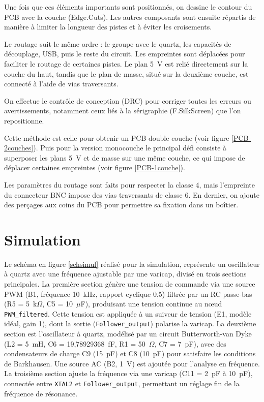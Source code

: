 \documentclass[12pt, a4paper, titlepage]{article}
\begin{document}
Une fois que ces éléments importants sont positionnés, on dessine le contour du PCB avec la couche (Edge.Cuts). Les autres composants sont ensuite répartis de manière à limiter la longueur des pistes et à éviter les croisements.

Le routage suit le même ordre : le groupe avec le quartz, les capacités de découplage, USB, puis le reste du circuit. Les empreintes sont déplacées pour faciliter le routage de certaines pistes. Le plan \SI{5}{\volt} est relié directement sur la couche du haut, tandis que le plan de masse, situé sur la deuxième couche, est connecté à l’aide de vias traversants.

On effectue le contrôle de conception (DRC) pour corriger toutes les erreurs ou avertissements, notamment ceux liés à la sérigraphie (F.SilkScreen) que l’on repositionne.

Cette méthode est celle pour obtenir un PCB double couche (voir figure \ref{PCB-2couches}). Puis pour la version monocouche le principal défi consiste à superposer les plans \SI{5}{\volt} et de masse sur une même couche, ce qui impose de déplacer certaines empreintes (voir figure \ref{PCB-1couche}).

Les paramètres du routage sont faits pour respecter la classe 4, mais l’empreinte du connecteur BNC impose des vias traversants de classe 6. En dernier, on ajoute des perçages aux coins du PCB pour permettre sa fixation dans un boîtier.


\section{Simulation}

Le schéma en figure \ref{schsimul} réalisé pour la simulation, représente un oscillateur à quartz avec une fréquence ajustable par une varicap, divisé en trois sections principales. La première section génère une tension de commande via une source PWM (B1, fréquence 10~kHz, rapport cyclique 0,5) filtrée par un RC passe-bas (R5 = 5~k$\Omega$, C5 = 10~$\mu$F), produisant une tension continue au nœud \texttt{PWM\_filtered}. Cette tension est appliquée à un suiveur de tension (E1, modèle idéal, gain 1), dont la sortie (\texttt{Follower\_output}) polarise la varicap. La deuxième section est l’oscillateur à quartz, modélisé par un circuit Butterworth-van Dyke \cite{Butterworth} (L2 = 5~mH, C6 = 19,78929368~fF, R1 = 50~$\Omega$, C7 = 7~pF), avec des condensateurs de charge C9 (15~pF) et C8 (10~pF) pour satisfaire les conditions de Barkhausen. Une source AC (B2, 1~V) est ajoutée pour l’analyse en fréquence. La troisième section ajuste la fréquence via une varicap (C11 = 2~pF à 10~pF), connectée entre \texttt{XTAL2} et \texttt{Follower\_output}, permettant un réglage fin de la fréquence de résonance.
\end{document}
